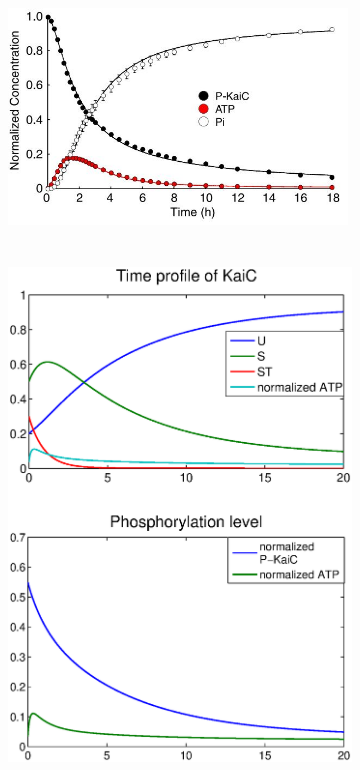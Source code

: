 \documentclass[a4paper,10pt]{article}
\numberwithin{equation}{section}
\begin{document}
\begin{figure}
\centering
\begin{subfigure}{0.45\textwidth }
\centering
\includegraphics[height=7cm,width=9cm]{kondo2012.jpg}
\end{subfigure}
\begin{subfigure}{0.45\textwidth }
\centering
\includegraphics[scale=0.5]{autodps5original.eps}

\end{subfigure}
\end{figure}
\end{document}
